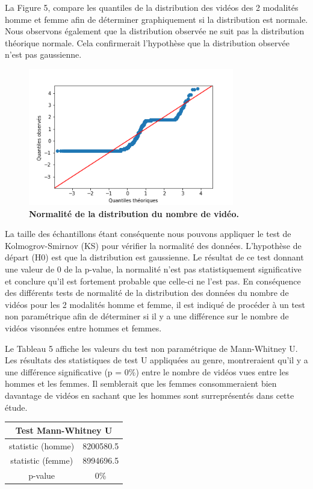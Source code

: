 \documentclass[12pt, a4paper, titlepage, table]{article}
\begin{document}
La Figure 5, compare les quantiles de la distribution des vidéos des 2 modalités homme et femme afin de déterminer graphiquement si la distribution est normale. Nous observons également que la distribution observée ne suit pas la distribution théorique normale. Cela confirmerait l'hypothèse que la distribution observée n'est pas gaussienne.


  	\begin{figure}[H]
  		\centering
  		\includegraphics[width=0.8\textwidth]{../../graph/distribution_video3.png}
  		\caption{\textbf{Normalité de la distribution du nombre de vidéo.}}
  	\end{figure}
  
La taille des échantillons étant conséquente nous pouvons appliquer le test de Kolmogrov-Smirnov (KS) pour vérifier la normalité des données. 
L'hypothèse de départ (H0) est que la distribution est gaussienne.
Le résultat de ce test donnant une valeur de 0 de la p-value, la normalité n'est pas statistiquement significative et conclure qu'il est fortement probable 
que celle-ci ne l'est pas.   
En conséquence des différents tests de normalité de la distribution des données du nombre de vidéos pour les 2 modalités homme et femme, il est indiqué
de procéder à un test non paramétrique afin de déterminer si il y a une différence sur le nombre de vidéos visonnées entre hommes et femmes. 

Le Tableau 5 affiche les valeurs du test non paramétrique de Mann-Whitney U. Les résultats des statistiques de test U appliquées au genre, montreraient 
qu'il y a une différence significative (p = 0\%) entre le nombre de vidéos vues entre les hommes et les femmes. 
Il semblerait que les femmes consommeraient bien davantage de vidéos en sachant que les hommes sont surreprésentés dans cette étude. 

\begin{table}[H]
	\centering
	\fontsize{12}{20}\selectfont
	\begin{tabular}{|c|c|}
		\hline
		\multicolumn{2}{|c|}{\textbf{Test Mann-Whitney U}}\\ 
		\hline 
		statistic (homme)& 8200580.5\\
		statistic (femme)& 8994696.5\\
		p-value& 0\%\\
		\hline
	\end{tabular}
\end{table}
\end{document}
